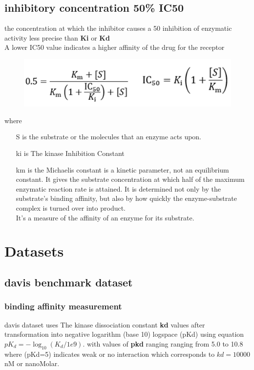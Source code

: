 \documentclass[11pt, a4paper]{article}
\begin{document}
    \subsection{inhibitory concentration 50\% \textbf{IC50}}
        the concentration at which the inhibitor causes a 50 inhibition of enzymatic activity
        less precise than \textbf{Ki} or \textbf{Kd} \\
        A lower IC50 value indicates a higher affinity of the drug for the receptor \\
        \begin{figure}[H]
            \centering
            \begin{minipage}{0.45\textwidth}
            \includegraphics[width=\textwidth]{affinity measurements/IC50.png}
            \end{minipage}   
        \end{figure}
        where
        \begin{itemize}
            \item [S] is the substrate or the molecules that an enzyme acts upon.
            \item [ki] is The kinase Inhibition Constant
            \item [km] is the Michaelis constant is a kinetic parameter, not an equilibrium constant. It gives the substrate concentration at which half of the maximum enzymatic reaction rate is attained. It is determined not only by the substrate’s binding affinity, but also by how quickly the enzyme-substrate complex is turned over into product.   
                       \\ It's a measure of the affinity of an enzyme for its substrate.      
        \end{itemize}

\section{Datasets}
    \subsection{davis benchmark dataset}
        \subsubsection{binding affinity measurement}
            davis dataset uses The kinase dissociation constant \textbf{kd} values after transformation into negative logarithm (base 10) logspace (pKd) using equation $pK_d = -\log_{10} (K_d / 1e9)$.
            with values of \textbf{pkd} ranging ranging from 5.0 to 10.8 where (pKd=5) indicates weak or no interaction which corresponds to $kd = 10000 $ nM or nanoMolar.
\end{document}
